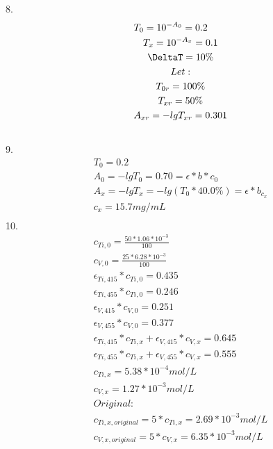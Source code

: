 \documentclass{article}
\begin{document}
8.\begin{equation}
    \begin{multlined}
        T_0 = 10^{-A_0} = 0.2\\
        T_x = 10^{-A_x} = 0.1\\
        \DeltaT = 10\%\\
        Let:\\
        T_{0r} = 100\%\\
        T_{xr} = 50\%\\
        A_{xr} = -lgT_{xr} = 0.301\\
    \end{multlined}
\end{equation}
9.\begin{equation}
    \begin{multlined}
        T_0 = 0.2\\
        A_0 = -lgT_0 = 0.70 = \epsilon*b*c_0\\
        A_x = -lgT_x = -lg(T_0*40.0\%) = \epsilon*b_c_x\\
        c_x = 15.7 mg/mL\\
    \end{multlined}
\end{equation}
10.\begin{equation}
    \begin{multlined}
        c_{Ti,0} = \frac{50*1.06*10^{-3}}{100}\\
        c_{V,0} = \frac{25*6.28*10^{-3}}{100}\\
        \epsilon_{Ti,415}*c_{Ti,0} = 0.435\\
        \epsilon_{Ti,455}*c_{Ti,0} = 0.246\\
        \epsilon_{V,415}*c_{V,0} = 0.251\\
        \epsilon_{V,455}*c_{V,0} = 0.377\\
        \epsilon_{Ti,415}*c_{Ti,x} + \epsilon_{V,415}*c_{V,x} = 0.645\\
        \epsilon_{Ti,455}*c_{Ti,x} + \epsilon_{V,455}*c_{V,x} = 0.555\\
        c_{Ti,x} = 5.38*10^{-4} mol/L\\
        c_{V,x} = 1.27*10^{-3} mol/L\\
        Original:\\
        c_{Ti,x,original} = 5 * c_{Ti,x} = 2.69*10^{-3} mol/L\\
        c_{V,x,original} = 5 * c_{V,x} = 6.35*10^{-3} mol/L\\
    \end{multlined}
\end{equation}
\end{document}
